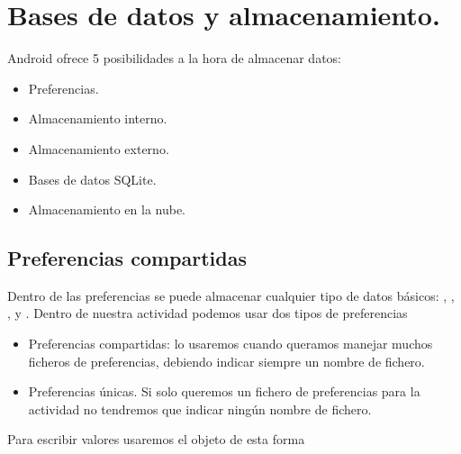 \documentclass[a4paper,12pt,spanish]{sphinxmanual}
\begin{document}
\section{Bases de datos y almacenamiento.}
\label{tema2:bases-de-datos-y-almacenamiento}
Android ofrece 5 posibilidades a la hora de almacenar datos:
\begin{itemize}
\item {} 
Preferencias.

\item {} 
Almacenamiento interno.

\item {} 
Almacenamiento externo.

\item {} 
Bases de datos SQLite.

\item {} 
Almacenamiento en la nube.

\end{itemize}


\subsection{Preferencias compartidas}
\label{tema2:preferencias-compartidas}
Dentro de las preferencias se puede almacenar cualquier tipo de datos básicos: , , ,  y . Dentro de nuestra actividad podemos usar dos tipos de preferencias
\begin{itemize}
\item {} 
Preferencias compartidas: lo usaremos cuando queramos manejar muchos ficheros de preferencias, debiendo indicar siempre un nombre de fichero.

\item {} 
Preferencias únicas. Si solo queremos un fichero de preferencias para la actividad no tendremos que indicar ningún nombre de fichero.

\end{itemize}

Para escribir valores usaremos el objeto  de esta forma
\end{document}
